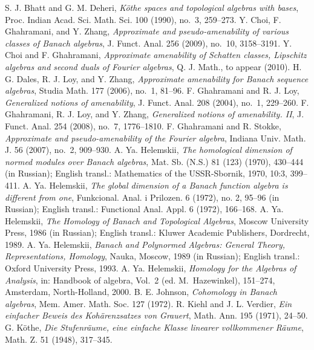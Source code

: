 \documentclass[12pt,reqno]{amsart}
\theoremstyle{definition}
\begin{document}
\begin{thebibliography}{99}
S. J. Bhatt and G. M. Deheri,
{\em K\"othe spaces and topological algebras with bases},
Proc. Indian Acad. Sci. Math. Sci. 100 (1990), no.~3, 259--273.
Y. Choi, F. Ghahramani, and Y. Zhang,
{\em Approximate and pseudo-amenability of various classes of Banach algebras},
J. Funct. Anal. 256 (2009), no.~10, 3158--3191.
Y. Choi and F. Ghahramani,
{\em Approximate amenability of Schatten classes, Lipschitz algebras
and second duals of Fourier algebras},
Q. J. Math., to appear (2010).
H. G. Dales, R. J. Loy, and Y. Zhang,
{\em Approximate amenability for Banach sequence algebras},
Studia Math. 177 (2006), no.~1, 81--96.
F. Ghahramani and R. J. Loy,
{\em Generalized notions of amenability},
J. Funct. Anal. 208 (2004), no.~1, 229--260.
F. Ghahramani, R. J. Loy, and Y. Zhang,
{\em Generalized notions of amenability. II},
J. Funct. Anal. 254 (2008), no.~7, 1776--1810.
F. Ghahramani and R. Stokke,
{\em Approximate and pseudo-amenability of the Fourier algebra},
Indiana Univ. Math. J. 56 (2007), no.~2, 909--930.
A. Ya. Helemskii,
{\em The homological dimension of normed modules over Banach algebras},
Mat. Sb. (N.S.) 81 (123) (1970), 430--444 (in Russian);
English transl.: Mathematics of the USSR-Sbornik, 1970, 10:3, 399--411.
A. Ya. Helemskii,
{\em The global dimension of a Banach function algebra is different from one},
Funkcional. Anal. i Prilozen. 6 (1972), no. 2, 95--96 (in Russian);
English transl.: Functional Anal. Appl. 6 (1972), 166--168.
A. Ya. Helemskii,
{\em The Homology of Banach and Topological Algebras},
Moscow University Press, 1986 (in Russian);
English transl.: Kluwer Academic Publishers, Dordrecht, 1989.
A. Ya. Helemskii,
{\em Banach and Polynormed Algebras: General Theory,
Representations, Homology},
Nauka, Moscow, 1989 (in Russian);
English transl.: Oxford University Press, 1993.
A. Ya. Helemskii,
{\em Homology for the Algebras of Analysis},
in: Handbook of algebra, Vol.~2 (ed. M.~Hazewinkel), 151--274,
Amsterdam, North-Holland, 2000.
B. E. Johnson,
{\em Cohomology in Banach algebras},
Mem. Amer. Math. Soc. 127 (1972).
R. Kiehl and J. L. Verdier,
{\itshape Ein einfacher Beweis des Koh\"arenzsatzes von Grauert},
Math. Ann. 195 (1971), 24--50.
G. K\"othe,
{\em Die Stufenr\"aume, eine einfache Klasse linearer vollkommener R\"aume},
Math. Z. 51 (1948), 317--345.

\end{thebibliography}
\end{document}

